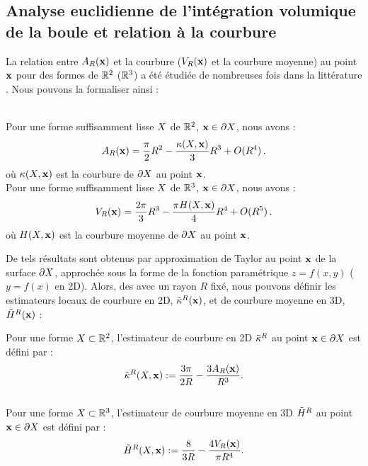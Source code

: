 \subsection{Analyse euclidienne de l'intégration volumique de la boule et relation à la courbure}
\label{sec:pottmann-principle}
%
La relation entre $A_R(\mathbf{x})$ et la courbure (\resp $V_R(\mathbf{x})$ et la courbure
moyenne) au point $\mathbf{x}$ pour des formes de $\mathbb{R}^2$ (\respp $\mathbb{R}^3$) a été étudiée
de nombreuses fois dans la littérature
\cite{Bullard1995,Pottmann2007,Pottmann2009}. Nous pouvons la formaliser ainsi :
%
\begin{lemma}{\textbf{\cite{Pottmann2009}}}\\
\label{lem:pottmann-2d}
  Pour une forme suffisamment lisse $X$ de $\mathbb{R}^2$, $\mathbf{x} \in \partial X$, nous
  avons :
  \begin{equation}
    \label{eq:volume2d}
    A_R(\mathbf{x}) = \frac{\pi}{2} R^2 - \frac{\kappa(X,\mathbf{x})}{3}R^3 + O(R^4)\,.
  \end{equation}
  où $\kappa(X,\mathbf{x})$ est la courbure de $\partial X$ au point $\mathbf{x}$.
  \\
  Pour une forme suffisamment lisse $X$ de $\mathbb{R}^3$, $\mathbf{x} \in \partial X$, nous
  avons :
  \begin{equation}
    \label{eq:volume3d}
    V_R(\mathbf{x}) = \frac{2\pi}{3} R^3 - \frac{\pi H(X,\mathbf{x})}{4}R^4 + O(R^5)\,.
  \end{equation}
  où $H(X,\mathbf{x})$ est la courbure moyenne de $\partial X$ au point $\mathbf{x}$.
\end{lemma}
%
De tels résultats sont obtenus par approximation de Taylor au point $\mathbf{x}$ de la
surface $\partial X$, approchée sous la forme de la fonction paramétrique $z=f(x,y)$ ($y=f(x)$ en
2D). Alors, des  avec un
rayon $R$ fixé, nous pouvons définir les estimateurs locaux de courbure en 2D,
$\tilde{\kappa}^{R}(\mathbf{x})$, et de courbure moyenne en 3D, $\tilde{H}^{R}(\mathbf{x})$ :
%
\begin{definition}{}
  \label{def:pottmann-2d-3d-mean}
  Pour une forme $X \subset \mathbb{R}^2$, l'estimateur de courbure en 2D $\tilde{\kappa}^{R}$
  au point $\mathbf{x} \in \partial X$ est défini par :
  \begin{equation}
    \label{eq:pottmann-2d}
    \tilde{\kappa}^{R}(X,\mathbf{x}) := \frac{3\pi}{2 R} - \frac{3 A_R(\mathbf{x})}{R^3} .
  \end{equation}
  \\
  Pour une forme $X \subset \mathbb{R}^3$, l'estimateur de courbure moyenne en 3D
  $\tilde{H}^{R}$ au point $\mathbf{x} \in \partial X$ est défini par :
  \begin{equation}
    \label{eq:pottmann-3d-mean}
    \tilde{H}^{R}(X,\mathbf{x}) := \frac{8}{3 R} - \frac{4 V_R(\mathbf{x})}{\pi R^4}.
  \end{equation}
\end{definition}
